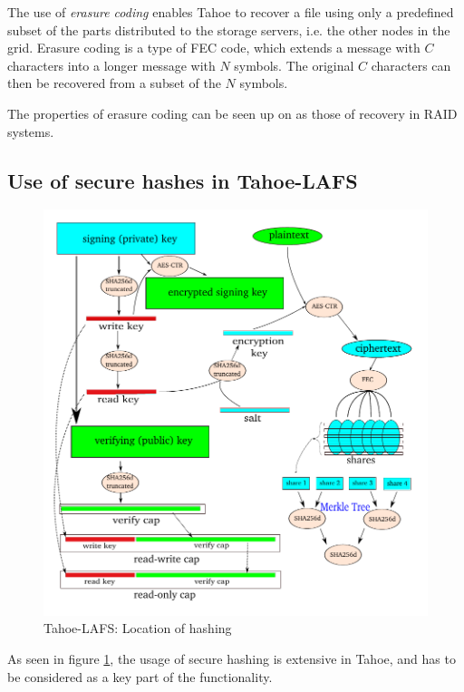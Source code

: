 \documentclass[english,12pt,a4paper]{book}
\begin{document}
The use of \emph{erasure coding} enables Tahoe to recover a file using only a
predefined subset of the parts distributed to the storage servers, i.e. the
other nodes in the grid. Erasure coding is a type of \ac{FEC} code, which
extends a message with $C$ characters into a longer message with $N$ symbols.
The original $C$ characters can then be recovered from a subset of the $N$
symbols.

The properties of erasure coding can be seen up on as those of recovery in RAID
systems.


\subsection{Use of secure hashes in Tahoe-LAFS}


\begin{figure}[h!]
    \centering
    \includegraphics[width=0.9\columnwidth]{Tahoe-hashing.pdf}
    \caption{Tahoe-LAFS: Location of hashing}
    \label{fig:tahoehashing}
\end{figure}

As seen in figure \ref{fig:tahoehashing}, the usage of secure hashing is
extensive in Tahoe, and has to be considered as a key part of the functionality.
\end{document}
